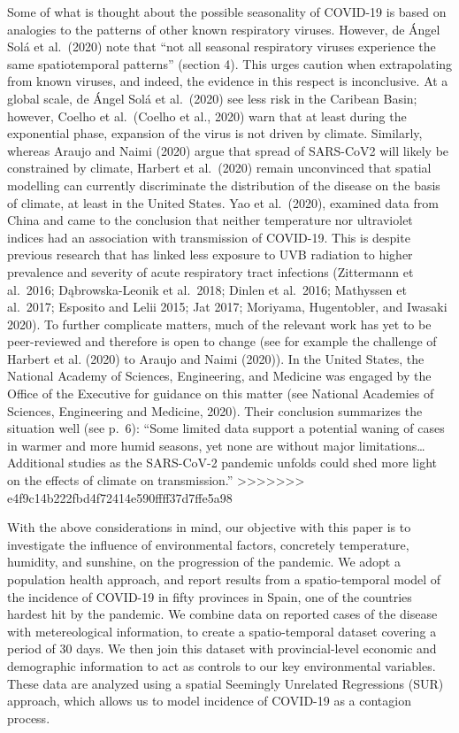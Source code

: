 \documentclass[]{elsarticle} %
\begin{document}
Some of what is thought about the possible seasonality of COVID-19 is
based on analogies to the patterns of other known respiratory viruses.
However, de Ángel Solá et al.~(2020) note that ``not all seasonal
respiratory viruses experience the same spatiotemporal patterns''
(section 4). This urges caution when extrapolating from known viruses,
and indeed, the evidence in this respect is inconclusive. At a global
scale, de Ángel Solá et al.~(2020) see less risk in the Caribean Basin;
however, Coelho et al.~(Coelho et al., 2020) warn that at least during
the exponential phase, expansion of the virus is not driven by climate.
Similarly, whereas Araujo and Naimi (2020) argue that spread of
SARS-CoV2 will likely be constrained by climate, Harbert et al.~(2020)
remain unconvinced that spatial modelling can currently discriminate the
distribution of the disease on the basis of climate, at least in the
United States. Yao et al.~(2020), examined data from China and came to
the conclusion that neither temperature nor ultraviolet indices had an
association with transmission of COVID-19. This is despite previous
research that has linked less exposure to UVB radiation to higher
prevalence and severity of acute respiratory tract infections
(Zittermann et al.~2016; Dąbrowska-Leonik et al.~2018; Dinlen et
al.~2016; Mathyssen et al.~2017; Esposito and Lelii 2015; Jat 2017;
Moriyama, Hugentobler, and Iwasaki 2020). To further complicate matters,
much of the relevant work has yet to be peer-reviewed and therefore is
open to change (see for example the challenge of Harbert et al. (2020)
to Araujo and Naimi (2020)). In the United States, the National Academy
of Sciences, Engineering, and Medicine was engaged by the Office of the
Executive for guidance on this matter (see National Academies of
Sciences, Engineering and Medicine, 2020). Their conclusion summarizes
the situation well (see p.~6): ``Some limited data support a potential
waning of cases in warmer and more humid seasons, yet none are without
major limitations\ldots{}Additional studies as the SARS-CoV-2 pandemic
unfolds could shed more light on the effects of climate on
transmission.''
>>>>>>> e4f9c14b222fbd4f72414e590ffff37d7ffe5a98

With the above considerations in mind, our objective with this paper is
to investigate the influence of environmental factors, concretely
temperature, humidity, and sunshine, on the progression of the pandemic.
We adopt a population health approach, and report results from a
spatio-temporal model of the incidence of COVID-19 in fifty provinces in
Spain, one of the countries hardest hit by the pandemic. We combine data
on reported cases of the disease with metereological information, to
create a spatio-temporal dataset covering a period of 30 days. We then
join this dataset with provincial-level economic and demographic
information to act as controls to our key environmental variables. These
data are analyzed using a spatial Seemingly Unrelated Regressions (SUR)
approach, which allows us to model incidence of COVID-19 as a contagion
process.
\end{document}
